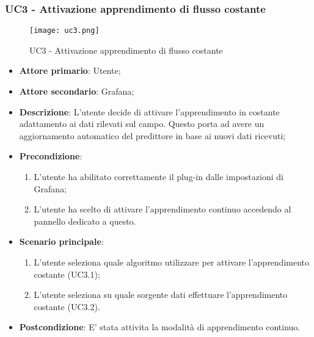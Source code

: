 \newpage
\subsubsection{UC3 - Attivazione apprendimento di flusso costante}
\label{sssec:UC3}

\begin{figure}[h!]
  \begin{center}
    \texttt{[image: uc3.png]}\\
    \caption{UC3 - Attivazione apprendimento di flusso costante}%
    \label{fig:uc3}
  \end{center}
  \end{figure}

\begin{itemize}
  \item \textbf{Attore primario}: Utente;
  \item \textbf{Attore secondario}: Grafana;
  \item \textbf{Descrizione}: L'utente decide di attivare l'apprendimento in costante adattamento ai dati rilevati sul campo. Questo porta ad avere un aggiornamento automatico del predittore in base ai nuovi dati ricevuti;
  \item \textbf{Precondizione}:
  \begin{enumerate}
    \item L'utente ha abilitato correttamente il plug-in dalle impostazioni di Grafana;
    \item L'utente ha scelto di attivare l'apprendimento continuo accedendo al pannello dedicato a questo.
  \end{enumerate}
  \item \textbf{Scenario principale}:
  \begin{enumerate}
    \item L'utente seleziona quale algoritmo utilizzare per attivare l'apprendimento costante (UC3.1);
    \item L'utente seleziona su quale sorgente dati effettuare l'apprendimento costante (UC3.2).
  \end{enumerate}
  \item \textbf{Postcondizione}: E' stata attivita la modalità di apprendimento continuo.
\end{itemize}

